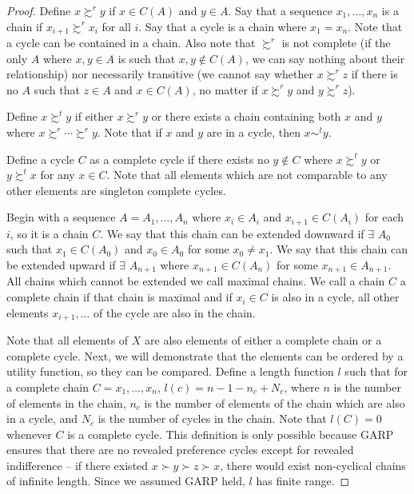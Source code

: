 \documentclass[12pt]{article}
\begin{document}
\begin{itemize}
\begin{proof}
        Define $x \succsim^r y$ if $x \in C(A)$ and $y \in A$. Say that a sequence $x_1,\dots,x_n$ is a chain if $x_{i+1} \succsim^r x_i$ for all $i$. Say that a cycle is a chain where $x_1 = x_n$. Note that a cycle can be contained in a chain. Also note that $\succsim^r$ is not complete (if the only $A$ where $x,y \in A$ is such that $x,y \not\in C(A)$, we can say nothing about their relationship) nor necessarily transitive (we cannot say whether $x \succsim^r z$ if there is no $A$ such that $z \in A$ and $x \in C(A)$, no matter if $x \succsim^r y$ and $y \succsim^r z$). 

        Define $x \succsim^t y$ if either $x \succsim^r y$ or there exists a chain containing both $x$ and $y$ where $x \succsim^r \cdots \succsim^r y$. Note that if $x$ and $y$ are in a cycle, then $x \sim^t y$.
        
        Define a cycle $C$ as a complete cycle if there exists no $y \not\in C$ where $x \succsim^t y$ or $y \succsim^t x$ for any $x \in C$. Note that all elements which are not comparable to any other elements are singleton complete cycles.

        Begin with a sequence $A = A_1,\dots,A_n$ where $x_i \in A_i$ and $x_{i+1} \in C(A_i)$ for each $i$, so it is a chain $C$. We say that this chain can be extended downward if $\exists$ $A_0$ such that $x_1 \in C(A_0)$ and $x_0 \in A_0$ for some $x_0 \ne x_1$. We say that this chain can be extended upward if $\exists$ $A_{n+1}$ where $x_{n+1} \in C(A_n)$ for some $x_{n+1} \in A_{n+1}$. All chains which cannot be extended we call maximal chains. We call a chain $C$ a complete chain if that chain is maximal and if $x_i \in C$ is also in a cycle, all other elements $x_{i+1},\dots$ of the cycle are also in the chain.

        Note that all elements of $X$ are also elements of either a complete chain or a complete cycle. Next, we will demonstrate that the elements can be ordered by a utility function, so they can be compared. Define a length function $l$ such that for a complete chain $C = x_1,\dots,x_n$, $l(c) = n - 1 - n_c + N_c$, where $n$ is the number of elements in the chain, $n_c$ is the number of elements of the chain which are also in a cycle, and $N_c$ is the number of cycles in the chain. Note that $l(C) = 0$ whenever $C$ is a complete cycle. This definition is only possible because GARP ensures that there are no revealed preference cycles except for revealed indifference -- if there existed $x \succ y \succ z \succ x$, there would exist non-cyclical chains of infinite length. Since we assumed GARP held, $l$ has finite range.


\end{proof}
\end{itemize}
\end{document}
